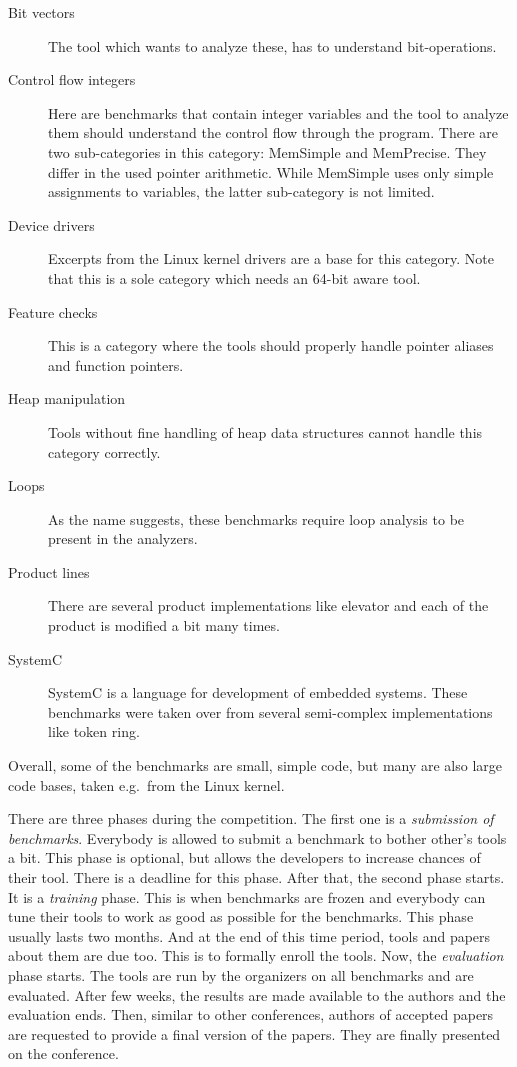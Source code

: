 \begin{description}
\item[Bit vectors] The tool which wants to analyze these, has to
understand bit-operations.

\item[Control flow integers] Here are benchmarks that contain integer
variables and the tool to analyze them should understand the control flow
through the program. There are two sub-categories in this category: MemSimple
and MemPrecise. They differ in the used pointer arithmetic. While MemSimple
uses only simple assignments to variables, the latter sub-category is not
limited.

\item[Device drivers] Excerpts from the Linux kernel drivers are a base for
this category. Note that this is a sole category which needs an 64-bit aware
tool.

\item[Feature checks] This is a category where the tools should properly
handle pointer aliases and function pointers.

\item[Heap manipulation] Tools without fine handling of heap data structures
cannot handle this category correctly.

\item[Loops] As the name suggests, these benchmarks require loop analysis to
be present in the analyzers.

\item[Product lines] There are several product implementations like elevator
and each of the product is modified a bit many times.

\item[SystemC] SystemC is a language for development of embedded systems.
These benchmarks were taken over from several semi-complex implementations
like token ring.

\end{description}
Overall, some of the benchmarks are small,
simple code, but many are also large code bases, taken e.g.\ from the Linux
kernel.

There are three phases during the competition. The first one is a
\emph{submission of benchmarks}. Everybody is allowed to submit a benchmark to
bother other's tools a bit. This phase is optional, but allows the developers
to increase chances of their tool. There is a deadline for this phase. After
that, the second phase starts. It is a \emph{training} phase. This is when
benchmarks are frozen and everybody can tune their tools to work as good as
possible for the benchmarks. This phase usually lasts two months. And at the
end of this time period, tools and papers about them are due too. This is to
formally enroll the tools. Now, the \emph{evaluation} phase starts. The tools
are run by the organizers on all benchmarks and are evaluated. After few
weeks, the results are made available to the authors and the evaluation ends.
Then, similar to other conferences, authors of accepted papers are requested
to provide a final version of the papers. They are finally presented on the
conference.

